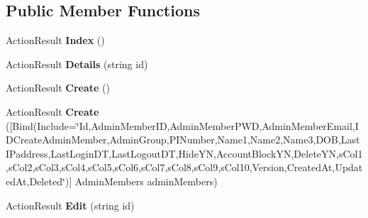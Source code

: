 \subsection*{Public Member Functions}
\begin{DoxyCompactItemize}
\item 
Action\+Result {\bfseries Index} ()\hypertarget{class_cloud_bread_admin_web_1_1_controllers_1_1_______admin_members_controller_ac47911c93488d797a612f8e6354b7795}{}\label{class_cloud_bread_admin_web_1_1_controllers_1_1_______admin_members_controller_ac47911c93488d797a612f8e6354b7795}

\item 
Action\+Result {\bfseries Details} (string id)\hypertarget{class_cloud_bread_admin_web_1_1_controllers_1_1_______admin_members_controller_abe523da28ab355ae9e0b41f220c270a4}{}\label{class_cloud_bread_admin_web_1_1_controllers_1_1_______admin_members_controller_abe523da28ab355ae9e0b41f220c270a4}

\item 
Action\+Result {\bfseries Create} ()\hypertarget{class_cloud_bread_admin_web_1_1_controllers_1_1_______admin_members_controller_ab820ac379056eb4f74b996f38ecc9456}{}\label{class_cloud_bread_admin_web_1_1_controllers_1_1_______admin_members_controller_ab820ac379056eb4f74b996f38ecc9456}

\item 
Action\+Result {\bfseries Create} (\mbox{[}Bind(Include=\char`\"{}Id,Admin\+Member\+ID,Admin\+Member\+P\+WD,Admin\+Member\+Email,I\+D\+Create\+Admin\+Member,Admin\+Group,P\+I\+Number,Name1,Name2,Name3,D\+OB,Last\+I\+Paddress,Last\+Login\+DT,Last\+Logout\+DT,Hide\+YN,Account\+Block\+YN,Delete\+YN,s\+Col1,s\+Col2,s\+Col3,s\+Col4,s\+Col5,s\+Col6,s\+Col7,s\+Col8,s\+Col9,s\+Col10,Version,Created\+At,Updated\+At,Deleted\char`\"{})\mbox{]} Admin\+Members admin\+Members)\hypertarget{class_cloud_bread_admin_web_1_1_controllers_1_1_______admin_members_controller_acd378b5e573b228154a3e5b8e23ccb23}{}\label{class_cloud_bread_admin_web_1_1_controllers_1_1_______admin_members_controller_acd378b5e573b228154a3e5b8e23ccb23}

\item 
Action\+Result {\bfseries Edit} (string id)\hypertarget{class_cloud_bread_admin_web_1_1_controllers_1_1_______admin_members_controller_ad7255f40bbb352721d65c6075b060f08}{}\label{class_cloud_bread_admin_web_1_1_controllers_1_1_______admin_members_controller_ad7255f40bbb352721d65c6075b060f08}


\end{DoxyCompactItemize}
